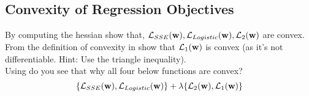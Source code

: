 \subsection{Convexity of Regression Objectives}

By computing the hessian show that, $\mathcal{L}_{SSE}(\mathbf{w}), \mathcal{L}_{Logistic}(\mathbf{w}), \mathcal{L}_2(\mathbf{w})$ are convex. From the definition of convexity in  show that $\mathcal{L}_1(\mathbf{w})$ is convex (as it's not differentiable. Hint: Use the triangle inequality).\\
Using  do you see that why all four below functions are convex?
$$\{\mathcal{L}_{SSE}(\mathbf{w}), \mathcal{L}_{Logistic}(\mathbf{w})\} + \lambda \{\mathcal{L}_2(\mathbf{w}), \mathcal{L}_1(\mathbf{w})\}$$